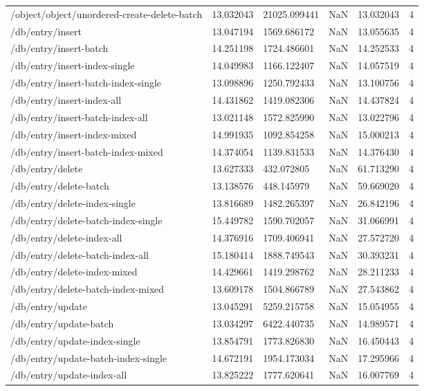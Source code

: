 \begin{tabularx}{\linewidth}{XXXXXX}
/object/object/unordered-create-delete-batch & 13.032043 & 21025.099441 & NaN & 13.032043 & 4 \\
/db/entry/insert & 13.047194 & 1569.686172 & NaN & 13.055635 & 4 \\
/db/entry/insert-batch & 14.251198 & 1724.486601 & NaN & 14.252533 & 4 \\
/db/entry/insert-index-single & 14.049983 & 1166.122407 & NaN & 14.057519 & 4 \\
/db/entry/insert-batch-index-single & 13.098896 & 1250.792433 & NaN & 13.100756 & 4 \\
/db/entry/insert-index-all & 14.431862 & 1419.082306 & NaN & 14.437824 & 4 \\
/db/entry/insert-batch-index-all & 13.021148 & 1572.825990 & NaN & 13.022796 & 4 \\
/db/entry/insert-index-mixed & 14.991935 & 1092.854258 & NaN & 15.000213 & 4 \\
/db/entry/insert-batch-index-mixed & 14.374054 & 1139.831533 & NaN & 14.376430 & 4 \\
/db/entry/delete & 13.627333 & 432.072805 & NaN & 61.713290 & 4 \\
/db/entry/delete-batch & 13.138576 & 448.145979 & NaN & 59.669020 & 4 \\
/db/entry/delete-index-single & 13.816689 & 1482.265397 & NaN & 26.842196 & 4 \\
/db/entry/delete-batch-index-single & 15.449782 & 1590.702057 & NaN & 31.066991 & 4 \\
/db/entry/delete-index-all & 14.376916 & 1709.406941 & NaN & 27.572720 & 4 \\
/db/entry/delete-batch-index-all & 15.180414 & 1888.749543 & NaN & 30.393231 & 4 \\
/db/entry/delete-index-mixed & 14.429661 & 1419.298762 & NaN & 28.211233 & 4 \\
/db/entry/delete-batch-index-mixed & 13.609178 & 1504.866789 & NaN & 27.543862 & 4 \\
/db/entry/update & 13.045291 & 5259.215758 & NaN & 15.054955 & 4 \\
/db/entry/update-batch & 13.034297 & 6422.440735 & NaN & 14.989571 & 4 \\
/db/entry/update-index-single & 13.854791 & 1773.826830 & NaN & 16.450443 & 4 \\
/db/entry/update-batch-index-single & 14.672191 & 1954.173034 & NaN & 17.295966 & 4 \\
/db/entry/update-index-all & 13.825222 & 1777.620641 & NaN & 16.007769 & 4 \\

\end{tabularx}
